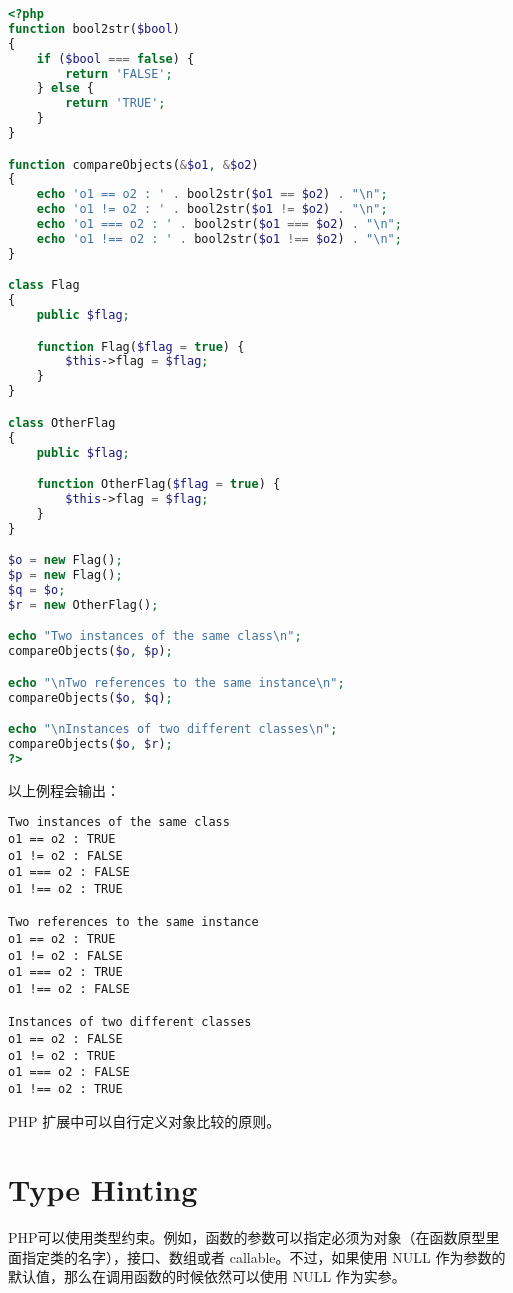 \begin{lstlisting}[language=PHP]
<?php
function bool2str($bool)
{
    if ($bool === false) {
        return 'FALSE';
    } else {
        return 'TRUE';
    }
}

function compareObjects(&$o1, &$o2)
{
    echo 'o1 == o2 : ' . bool2str($o1 == $o2) . "\n";
    echo 'o1 != o2 : ' . bool2str($o1 != $o2) . "\n";
    echo 'o1 === o2 : ' . bool2str($o1 === $o2) . "\n";
    echo 'o1 !== o2 : ' . bool2str($o1 !== $o2) . "\n";
}

class Flag
{
    public $flag;

    function Flag($flag = true) {
        $this->flag = $flag;
    }
}

class OtherFlag
{
    public $flag;

    function OtherFlag($flag = true) {
        $this->flag = $flag;
    }
}

$o = new Flag();
$p = new Flag();
$q = $o;
$r = new OtherFlag();

echo "Two instances of the same class\n";
compareObjects($o, $p);

echo "\nTwo references to the same instance\n";
compareObjects($o, $q);

echo "\nInstances of two different classes\n";
compareObjects($o, $r);
?>
\end{lstlisting}

以上例程会输出：

\begin{verbatim}
Two instances of the same class
o1 == o2 : TRUE
o1 != o2 : FALSE
o1 === o2 : FALSE
o1 !== o2 : TRUE

Two references to the same instance
o1 == o2 : TRUE
o1 != o2 : FALSE
o1 === o2 : TRUE
o1 !== o2 : FALSE

Instances of two different classes
o1 == o2 : FALSE
o1 != o2 : TRUE
o1 === o2 : FALSE
o1 !== o2 : TRUE
\end{verbatim}


PHP 扩展中可以自行定义对象比较的原则。




\chapter{Type Hinting}

PHP可以使用类型约束。例如，函数的参数可以指定必须为对象（在函数原型里面指定类的名字），接口、数组或者 callable。不过，如果使用 NULL 作为参数的默认值，那么在调用函数的时候依然可以使用 NULL 作为实参。

